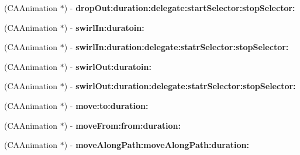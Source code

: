 \begin{DoxyCompactItemize}
\item 
\hypertarget{interface_t_x_s_animation_factory_ab7ebf1bcdd780bc3aeb7e9a36acc5eeb}{}(C\+A\+Animation $\ast$) -\/ {\bfseries drop\+Out\+:duration\+:delegate\+:start\+Selector\+:stop\+Selector\+:}\label{interface_t_x_s_animation_factory_ab7ebf1bcdd780bc3aeb7e9a36acc5eeb}

\item 
\hypertarget{interface_t_x_s_animation_factory_a776628dc9d479f575baae30398b3f53d}{}(C\+A\+Animation $\ast$) -\/ {\bfseries swirl\+In\+:duratoin\+:}\label{interface_t_x_s_animation_factory_a776628dc9d479f575baae30398b3f53d}

\item 
\hypertarget{interface_t_x_s_animation_factory_af31e423db481ff2e4fc500969382e273}{}(C\+A\+Animation $\ast$) -\/ {\bfseries swirl\+In\+:duration\+:delegate\+:statr\+Selector\+:stop\+Selector\+:}\label{interface_t_x_s_animation_factory_af31e423db481ff2e4fc500969382e273}

\item 
\hypertarget{interface_t_x_s_animation_factory_a4d9e8b77cf3338a1fc43bc03ab6c450a}{}(C\+A\+Animation $\ast$) -\/ {\bfseries swirl\+Out\+:duratoin\+:}\label{interface_t_x_s_animation_factory_a4d9e8b77cf3338a1fc43bc03ab6c450a}

\item 
\hypertarget{interface_t_x_s_animation_factory_ae6cc75d387f74eccc1fdbf167ca14faa}{}(C\+A\+Animation $\ast$) -\/ {\bfseries swirl\+Out\+:duration\+:delegate\+:statr\+Selector\+:stop\+Selector\+:}\label{interface_t_x_s_animation_factory_ae6cc75d387f74eccc1fdbf167ca14faa}

\item 
\hypertarget{interface_t_x_s_animation_factory_aa8a25605105864d137cd3363a9dffb49}{}(C\+A\+Animation $\ast$) -\/ {\bfseries move\+:to\+:duration\+:}\label{interface_t_x_s_animation_factory_aa8a25605105864d137cd3363a9dffb49}

\item 
\hypertarget{interface_t_x_s_animation_factory_ab1589682860a9ed223b338851884eab0}{}(C\+A\+Animation $\ast$) -\/ {\bfseries move\+From\+:from\+:duration\+:}\label{interface_t_x_s_animation_factory_ab1589682860a9ed223b338851884eab0}

\item 
\hypertarget{interface_t_x_s_animation_factory_ad3b28924e26e7d18789b4418080e386d}{}(C\+A\+Animation $\ast$) -\/ {\bfseries move\+Along\+Path\+:move\+Along\+Path\+:duration\+:}\label{interface_t_x_s_animation_factory_ad3b28924e26e7d18789b4418080e386d}


\end{DoxyCompactItemize}
